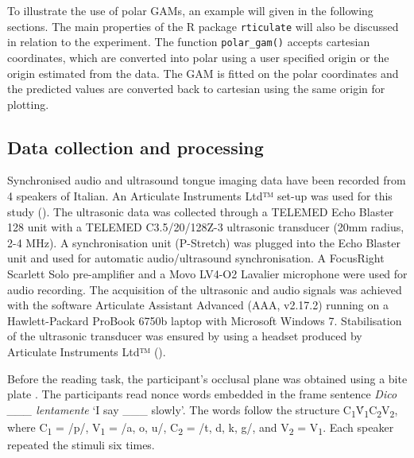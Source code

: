 \documentclass[12pt,]{article}
\begin{document}
To illustrate the use of polar GAMs, an example will given in the
following sections. The main properties of the R package
\texttt{rticulate} will also be discussed in relation to the experiment.
The function \texttt{polar\_gam()} accepts cartesian coordinates, which
are converted into polar using a user specified origin or the origin
estimated from the data. The GAM is fitted on the polar coordinates and
the predicted values are converted back to cartesian using the same
origin for plotting.

\hypertarget{data-collection-and-processing}{%
\subsection{Data collection and
processing}\label{data-collection-and-processing}}

Synchronised audio and ultrasound tongue imaging data have been recorded
from 4 speakers of Italian. An Articulate Instruments Ltd™ set-up was
used for this study (). The ultrasonic data was
collected through a TELEMED Echo Blaster 128 unit with a TELEMED
C3.5/20/128Z-3 ultrasonic transducer (20mm radius, 2-4 MHz). A
synchronisation unit (P-Stretch) was plugged into the Echo Blaster unit
and used for automatic audio/ultrasound synchronisation. A FocusRight
Scarlett Solo pre-amplifier and a Movo LV4-O2 Lavalier microphone were
used for audio recording. The acquisition of the ultrasonic and audio
signals was achieved with the software Articulate Assistant Advanced
(AAA, v2.17.2) running on a Hawlett-Packard ProBook 6750b laptop with
Microsoft Windows 7. Stabilisation of the ultrasonic transducer was
ensured by using a headset produced by Articulate Instruments Ltd™
(\citeyear{articulate2008}).

Before the reading task, the participant's occlusal plane was obtained
using a bite plate \citep{scobbie2011}. The participants read nonce
words embedded in the frame sentence \emph{Dico \_\_\_ lentamente} `I
say \_\_\_ slowly'. The words follow the structure
C\textsubscript{1}V́\textsubscript{1}C\textsubscript{2}V\textsubscript{2},
where C\textsubscript{1} = /p/, V\textsubscript{1} = /a, o, u/,
C\textsubscript{2} = /t, d, k, g/, and V\textsubscript{2} =
V\textsubscript{1}. Each speaker repeated the stimuli six times.
\end{document}

